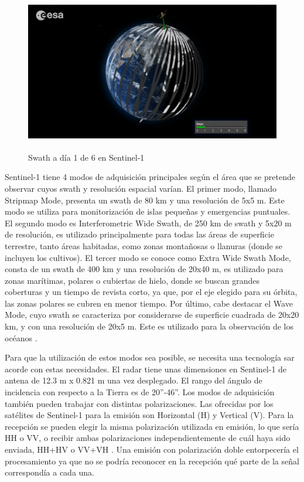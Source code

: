 \\
\begin{figure}[h]
    \centering
    \includegraphics[height=7cm]{archivos/tfg/swathS1} %
    \caption{Swath a día 1 de 6 en Sentinel-1 \cite{ESAcons}}
    \label{fig:swath}
\end{figure}
\par Sentinel-1 tiene 4 modos de adquisición principales según el área que se pretende observar cuyos swath y resolución espacial varían. El primer modo, llamado Stripmap Mode, presenta un swath de 80 km y una resolución de 5x5 m. Este modo se utiliza para monitorización de islas pequeñas y emergencias puntuales. El segundo modo es Interferometric Wide Swath, de 250 km de swath y 5x20 m de resolución, es utilizado principalmente para todas las áreas de superficie terrestre, tanto áreas habitadas, como zonas montañosas o llanuras (donde se incluyen los cultivos). El tercer modo se conoce como Extra Wide Swath Mode, consta de un swath de 400 km y una resolución de 20x40 m, es utilizado para zonas marítimas, polares o cubiertas de hielo, donde se buscan grandes coberturas y un tiempo de revista corto, ya que, por el eje elegido para su órbita, las zonas polares se cubren en menor tiempo. Por último, cabe destacar el Wave Mode, cuyo swath se caracteriza por considerarse de superficie cuadrada de 20x20 km, y con una resolución de 20x5 m. Este es utilizado para la observación de los océanos \cite{EOSs1}. 
\\
\par Para que la utilización de estos modos sea posible, se necesita una tecnología \gls{sar} acorde con estas necesidades. El radar tiene unas dimensiones en Sentinel-1 de antena de 12.3 m x 0.821 m una vez desplegado. El rango del ángulo de incidencia con respecto a la Tierra es de 20”-46”. Los modos de adquisición también pueden trabajar con distintas polarizaciones. Las ofrecidas por los satélites de Sentinel-1 para la emisión son Horizontal (H) y Vertical (V). Para la recepción se pueden elegir la misma polarización utilizada en emisión, lo que sería HH o VV, o recibir ambas polarizaciones independientemente de cuál haya sido enviada, HH+HV o VV+VH \cite{EOSs1}. Una emisión con polarización doble entorpecería el procesamiento ya que no se podría reconocer en la recepción qué parte de la señal correspondía a cada una. 


